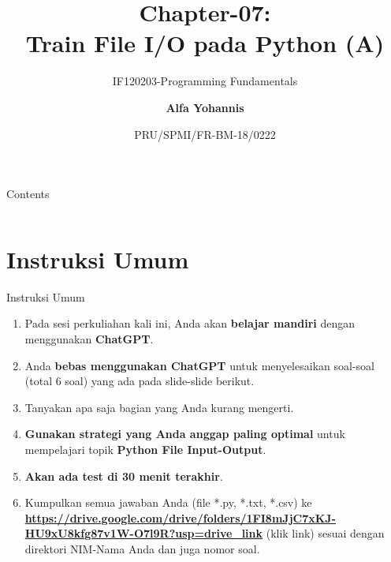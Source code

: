 \documentclass[aspectratio=169, table]{beamer}
\subtitle{IF120203-Programming Fundamentals}
\title{Chapter-07:\\\LARGE{Train File I/O pada Python (A)\\}
\vspace{10pt}}
\date[Serial]{\scriptsize {PRU/SPMI/FR-BM-18/0222}}
\author[Pradita]{\small{\textbf{Alfa Yohannis}}}
\begin{document}
\frame{\titlepage}

\begin{frame}[fragile]{Contents}
\vspace{15pt}
\begin{columns}[t]
\begin{column}{.4\textwidth}
\tableofcontents[sections={1-4}]
\end{column}
\begin{column}{.6\textwidth}
\tableofcontents[sections={5-99}]
\end{column}
\end{columns}
\end{frame}

\section{Instruksi Umum}
\begin{frame}[fragile]{Instruksi Umum}
\begin{enumerate}
\item Pada sesi perkuliahan kali ini, Anda akan \textbf{belajar mandiri} dengan menggunakan \textbf{ChatGPT}.
\item Anda \textbf{bebas menggunakan ChatGPT} untuk menyelesaikan soal-soal (total 6 soal) yang ada pada slide-slide berikut.
\item Tanyakan apa saja bagian yang Anda kurang mengerti.
\item \textbf{Gunakan strategi yang Anda anggap paling optimal} untuk mempelajari topik \textbf{Python File Input-Output}.
\item \textbf{Akan ada test di 30 menit terakhir}.
\item Kumpulkan semua jawaban Anda (file *.py, *.txt, *.csv) ke \textcolor{blue}{\textbf{\url{https://drive.google.com/drive/folders/1FI8mJjC7xKJ-HU9xU8kfg87v1W-O7l9R?usp=drive_link}}} (klik link) sesuai dengan direktori NIM-Nama Anda dan juga nomor soal. 
\end{enumerate}
\end{frame}
\end{document}
